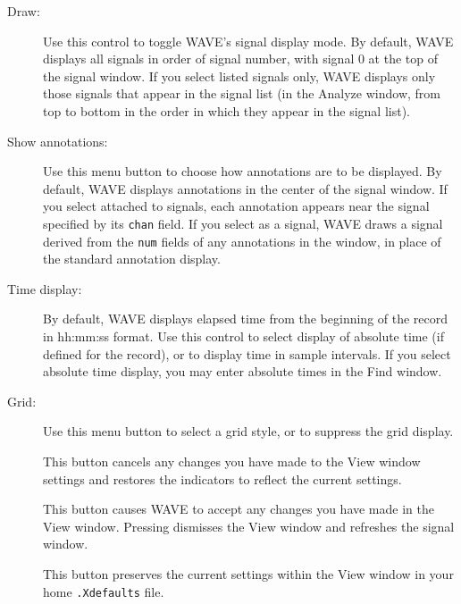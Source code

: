 \documentclass[twoside]{book}
\newcommand{\keycap}[1]{\cornersize{.5}\Ovalbox{\small\sf #1}}
\newcommand{\button}[1]{\cornersize{2}\ovalbox{\rule[-.3mm]{0cm}{2.5mm}\small\sf ~#1~}}
\newcommand{\amenubutton}[1]{{\sf #1}~\keycap{\ensuremath{\nabla}}}
\newcommand{\WAVE}{{\sf WAVE}\xspace}
\begin{document}
\begin{description}

\item[\amenubutton{Draw:}]
Use this control to toggle \WAVE{}'s signal display mode.  By default,
\WAVE{} displays all signals in order of signal number, with signal 0 at the
top of the signal window.  If you select {\sf listed signals only}, \WAVE{}
displays only those signals that appear in the signal list (in the {\sf
Analyze} window, from top to bottom in the order in which they appear
in the signal list).

\item[\amenubutton{Show annotations:}]
Use this menu button to choose how annotations are to be displayed.  By
default, \WAVE{} displays annotations in the center of the signal window.
If you select {\sf attached to signals}, each annotation appears near the
signal specified by its {\tt chan} field.  If you select {\sf as a signal},
\WAVE{} draws a signal derived from the {\tt num} fields of any annotations
in the window, in place of the standard annotation display.

\item[\amenubutton{Time display:}]
By default, \WAVE{} displays elapsed time from the beginning of the record
in {\sf hh:mm:ss} format.  Use this control to select display of absolute time
(if defined for the record), or to display time in sample intervals.  If you
select absolute time display, you may enter absolute times in the {\sf Find}
window.

\item[\amenubutton{Grid:}]
Use this menu button to select a grid style, or to suppress the grid display.

\item[\button{Undo changes}]
This button cancels any changes you have made to the {\sf View} window
settings and restores the indicators to reflect the current settings.

\item[\button{Redraw}]
This button causes \WAVE{} to accept any changes you have made in the {\sf
View} window.  Pressing \button{Redraw} dismisses the {\sf View} window and
refreshes the signal window.

\item[\button{Save as new defaults}]
This button preserves the current settings within the {\sf View}
window in your home {\tt .Xdefaults} file.

\end{description}
\end{document}
